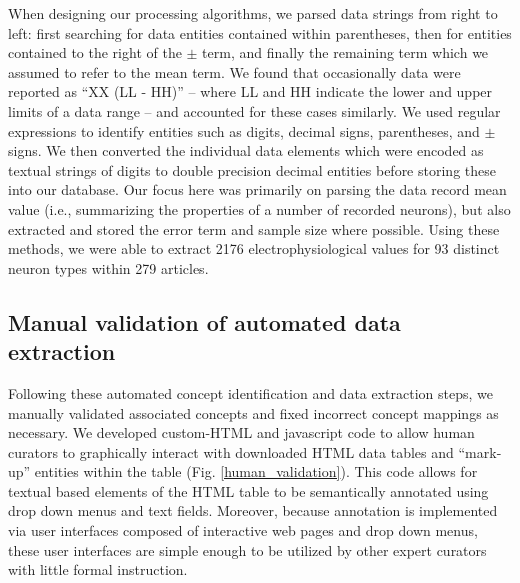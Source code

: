 \documentclass{template/frontiersSCNS} %
\begin{document}
When designing our processing algorithms, we parsed data strings from right to left: 
first searching for data entities contained within parentheses, then for entities contained to the right of the $\pm$ term, and finally the remaining term which we assumed to refer to the mean term.  
We found that occasionally data were reported as ``XX (LL - HH)'' -- where LL and HH indicate the lower and upper limits of a data range -- and accounted for these cases similarly.  
We used regular expressions to identify entities such as digits, decimal signs, parentheses, and $\pm$ signs.  
We then converted the individual data elements which were encoded as textual strings of digits to double precision decimal entities before storing these into our database.  
Our focus here was primarily on parsing the data record mean value (i.e., summarizing the properties of a number of recorded neurons), but also extracted and stored the error term and sample size where possible.  
Using these methods, we were able to extract 2176 electrophysiological values for 93 distinct neuron types within 279 articles.

\subsection{Manual validation of automated data extraction}
Following these automated concept identification and data extraction steps, we manually validated associated concepts and fixed incorrect concept mappings as necessary.  
We developed custom-HTML and javascript code to allow human curators to graphically interact with downloaded HTML data tables and ``mark-up'' entities within the table (Fig. \ref{human_validation}).  
This code allows for textual based elements of the HTML table to be semantically annotated using drop down menus and text fields.  
Moreover, because annotation is implemented via user interfaces composed of interactive web pages and drop down menus, these user interfaces are simple enough to be utilized by other expert curators with little formal instruction. 
\end{document}

